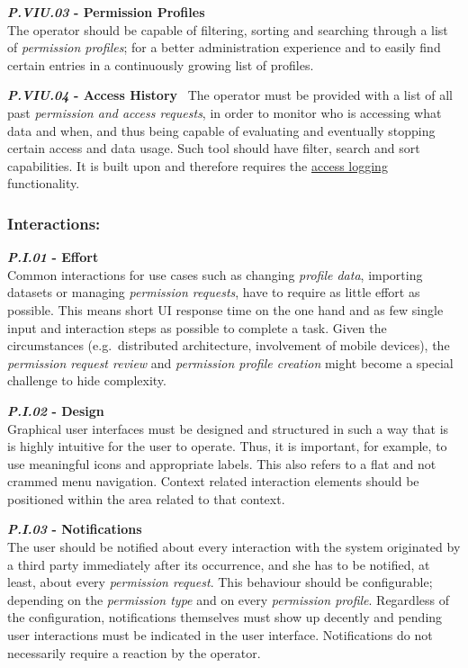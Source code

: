 \documentclass[12pt,english,a4paper,titlepage,cleardoublepage=empty,dottedtoc]{report}
\begin{document}
\textbf{\emph{\protect\hypertarget{pviu03}{}{P.VIU.03}} - Permission
Profiles}\\
The operator should be capable of filtering, sorting and searching
through a list of \emph{permission profiles}; for a better
administration experience and to easily find certain entries in a
continuously growing list of profiles.

\textbf{\emph{\protect\hypertarget{pviu04}{}{P.VIU.04}} - Access
History}~ The operator must be provided with a list of all past
\emph{permission and access requests}, in order to monitor who is
accessing what data and when, and thus being capable of evaluating and
eventually stopping certain access and data usage. Such tool should have
filter, search and sort capabilities. It is built upon and therefore
requires the \protect\hyperlink{pb01}{access logging} functionality.

\subsubsection*{Interactions:}\label{interactions}

\textbf{\emph{\protect\hypertarget{pi01}{}{P.I.01}} - Effort}\\
Common interactions for use cases such as changing \emph{profile data},
importing datasets or managing \emph{permission requests}, have to
require as little effort as possible. This means short UI response time
on the one hand and as few single input and interaction steps as
possible to complete a task. Given the circumstances (e.g.~distributed
architecture, involvement of mobile devices), the \emph{permission
request review} and \emph{permission profile creation} might become a
special challenge to hide complexity.

\textbf{\emph{\protect\hypertarget{pi02}{}{P.I.02}} - Design}\\
Graphical user interfaces must be designed and structured in such a way
that is is highly intuitive for the user to operate. Thus, it is
important, for example, to use meaningful icons and appropriate labels.
This also refers to a flat and not crammed menu navigation. Context
related interaction elements should be positioned within the area
related to that context.

\textbf{\emph{\protect\hypertarget{pi03}{}{P.I.03}} - Notifications}\\
The user should be notified about every interaction with the system
originated by a third party immediately after its occurrence, and she
has to be notified, at least, about every \emph{permission request}.
This behaviour should be configurable; depending on the \emph{permission
type} and on every \emph{permission profile}. Regardless of the
configuration, notifications themselves must show up decently and
pending user interactions must be indicated in the user interface.
Notifications do not necessarily require a reaction by the operator.
\end{document}
